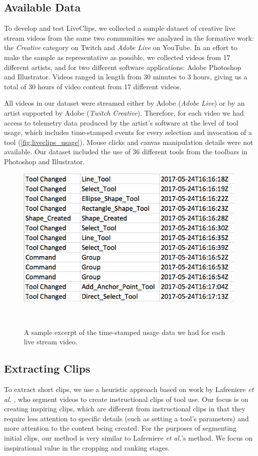 \subsection{Available Data}
To develop and test LiveClips, we collected a sample dataset of creative live stream videos from the same two communities we analyzed in the formative work: the \textit{Creative} category on Twitch and \textit{Adobe Live} on YouTube. In an effort to make the sample as representative as possible, we collected videos from 17 different artists, and for two different software applications: Adobe Photoshop and Illustrator. Videos ranged in length from 30 minutes to 3 hours, giving us a total of 30 hours of video content from 17 different videos. 

All videos in our dataset were streamed either by Adobe (\textit{Adobe Live}) or by an artist supported by Adobe (\textit{Twitch Creative}). Therefore, for each video we had access to telemetry data produced by the artist's software at the level of tool usage, which includes time-stamped events for every selection and invocation of a tool (\autoref{fig:liveclips_usage}). Mouse clicks and canvas manipulation details were not available. Our dataset included the use of 36 different tools from the toolbars in Photoshop and Illustrator.  

\begin{figure}[b!]
\centering
  \includegraphics[width=0.5\columnwidth]{liveclips/figures/usage.png}
  \caption{A sample excerpt of the time-stamped usage data we had for each live stream video.}~\label{fig:liveclips_usage}
\end{figure}


\subsection{Extracting Clips}
To extract short clips, we use a heuristic approach based on work by Lafreniere \textit{et al.} \cite{Lafreniere2014}, who segment videos to create instructional clips of tool use. Our focus is on creating inspiring clips, which are different from instructional clips in that they require less attention to specific details (such as setting a tool's parameters) and more attention to the content being created. For the purposes of segmenting initial clips, our method is very similar to Lafreniere \textit{et al.}'s method. We focus on inspirational value in the cropping and ranking stages.

